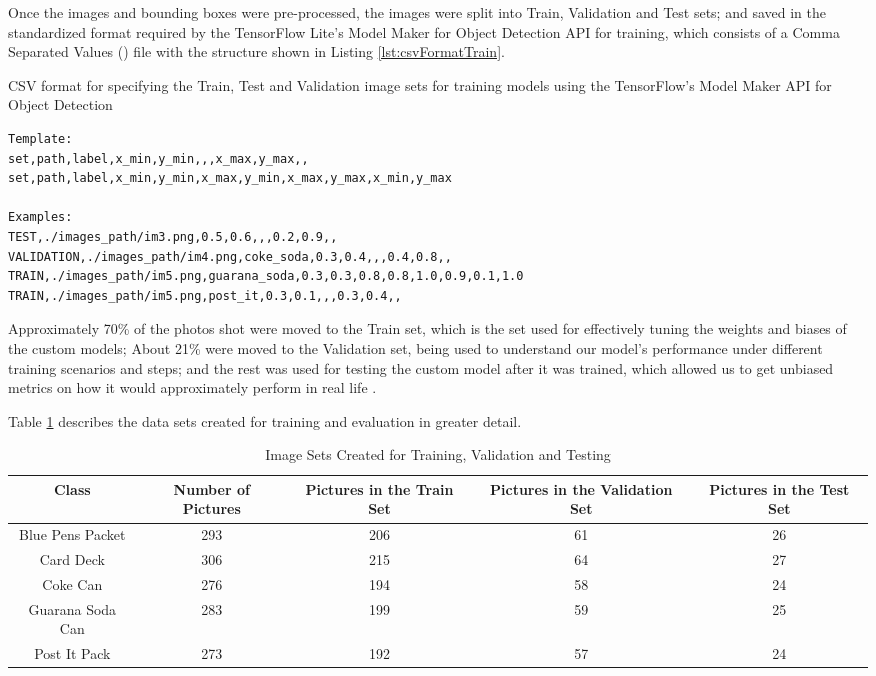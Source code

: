 Once the images and bounding boxes were pre-processed, the images were split
into Train, Validation and Test sets; and saved in the standardized format
required by the TensorFlow Lite's Model Maker for Object Detection API for
training, which consists of a Comma Separated Values () file with the structure shown in Listing \ref{lst:csvFormatTrain}.

\begin{sourcecode}
\caption{CSV format for specifying the Train, Test and Validation 
	image sets for training models using the TensorFlow's Model Maker API for Object 
	Detection}
\begin{lstlisting}[label={lst:csvFormatTrain}]
Template:
set,path,label,x_min,y_min,,,x_max,y_max,,
set,path,label,x_min,y_min,x_max,y_min,x_max,y_max,x_min,y_max

Examples:
TEST,./images_path/im3.png,0.5,0.6,,,0.2,0.9,,
VALIDATION,./images_path/im4.png,coke_soda,0.3,0.4,,,0.4,0.8,,
TRAIN,./images_path/im5.png,guarana_soda,0.3,0.3,0.8,0.8,1.0,0.9,0.1,1.0
TRAIN,./images_path/im5.png,post_it,0.3,0.1,,,0.3,0.4,,
\end{lstlisting}
\fonte{}
\end{sourcecode}

Approximately 70\% of the photos shot were moved to the Train set, which is the set used for effectively 
tuning the weights and biases of the custom models; About 21\% were moved to the Validation set, 
being used to understand our model's performance under different training scenarios and steps; 
and the rest was used for testing the custom model after it was trained, which allowed us to 
get unbiased metrics on how it would approximately perform in real life \cite{MluExplain}.

Table \ref{tbl:imageSetsTab} describes the data sets created for training and evaluation in greater detail.

\begin{table}[H]
	\centering
	\caption[Image Sets Created for Training, Validation and Testing]{Image Sets Created for Training, Validation and Testing}
	\begin{adjustbox}{width=1\textwidth}
	\label{tab:imageSets}
	\begin{tabular}{c|c|c|c|c}
		\hline 
		Class & Number of Pictures & Pictures in the Train Set & Pictures in the Validation Set & Pictures in the Test Set \\
		\hline
        Blue Pens Packet & 293 & 206 & 61 & 26\\
		Card Deck & 306 & 215 & 64 & 27\\
		Coke Can & 276 & 194 & 58 & 24\\
		Guarana Soda Can & 283 & 199 & 59 & 25\\
		Post It Pack & 273 & 192 & 57 & 24\\
		\hline 
	\end{tabular}
	\end{adjustbox}
	\label{tbl:imageSetsTab}
	\fonte{}
\end{table}

